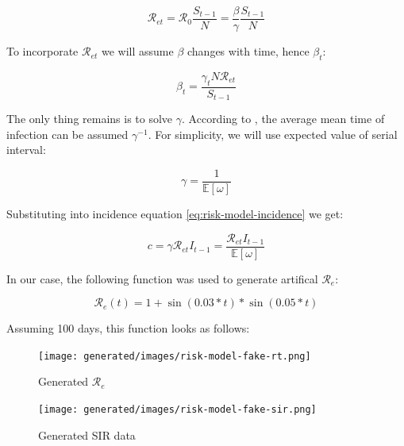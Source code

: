 \documentclass[
  digital, %
  oneside, %
  lof,     %
  lot,     %
]{fithesis4}
\begin{document}
\begin{equation}\label{eq:risk-model-rt}
\mathcal{R}_{et} = \mathcal{R}_0 \frac{S_{t-1}}{N} = \frac{\beta}{\gamma} \frac{S_{t-1}}{N}
\end{equation}

To incorporate $\mathcal{R}_{et}$ we will assume $\beta$ changes with time, hence $\beta_t$:

\begin{equation}
\beta_t = \frac{\gamma_t N \mathcal{R}_{et}}{S_{t-1}}
\end{equation}

The only thing remains is to solve $\gamma$. According to \cite{ma2019},
the average mean time of infection can be assumed $\gamma^{-1}$.
For simplicity, we will use expected value of serial interval:

\begin{equation}
  \gamma = \frac{1}{\mathbb{E}[\omega]}
\end{equation}

Substituting into incidence equation \eqref{eq:risk-model-incidence} we get:

\begin{equation}
  c = \gamma \mathcal{R}_{et} I_{t-1} = \frac{\mathcal{R}_{et} I_{t-1}}{\mathbb{E}[\omega]}
\end{equation}

In our case, the following function was used to generate 
artifical $\mathcal{R}_{e}$:

\begin{equation}
  \mathcal{R}_{e}(t) = 1 + \sin (0.03 * t) * \sin (0.05 * t)
\end{equation}

Assuming 100 days, this function looks as follows:

\begin{figure}[H]
  \begin{center}
    \texttt{[image: generated/images/risk-model-fake-rt.png]}
  \end{center}
  \caption{Generated $\mathcal{R}_{e}$}
  \label{fig:risk-model-fake-rt}
\end{figure}

\begin{figure}[H]
  \begin{center}
    \texttt{[image: generated/images/risk-model-fake-sir.png]}
  \end{center}
  \caption{Generated SIR data}
  \label{fig:risk-model-fake-sir}
\end{figure}
\end{document}

